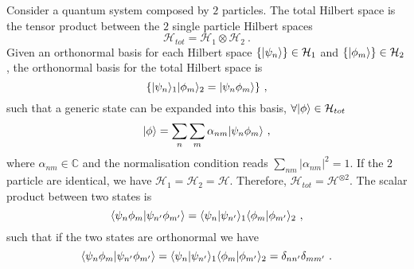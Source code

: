     Consider a quantum system composed by $2$ particles. The total Hilbert space is the tensor product between the $2$ single particle Hilbert spaces 
    \begin{equation*}
        \mathcal H_{tot} = \mathcal H_1 \otimes \mathcal H_2 ~. 
    \end{equation*}
    Given an orthonormal basis for each Hilbert space $\{\vert\psi_n\rangle\} \in \mathcal H_1$ and $\{\vert\phi_m\rangle\} \in \mathcal H_2$, the orthonormal basis for the total Hilbert space is 
    \begin{equation*}
        \{\vert\psi_n\rangle_1 \vert\phi_m\rangle_2 = \vert\psi_n \phi_m\rangle\} ~,
    \end{equation*}
    such that a generic state can be expanded into this basis, $\forall \vert\phi\rangle \in \mathcal H_{tot}$
    \begin{equation*}
        \vert\phi\rangle = \sum_n \sum_m \alpha_{nm} \vert\psi_n \phi_m\rangle ~,
    \end{equation*}
    where $\alpha_{nm} \in \mathbb C$ and the normalisation condition reads $\sum_{nm} |\alpha_{nm}|^2 = 1$. 
    If the $2$ particle are identical, we have $\mathcal H_1 = \mathcal H_2 = \mathcal H$. Therefore, $\mathcal H_{tot} = \mathcal H^{\otimes 2}$.
    The scalar product between two states is 
    \begin{equation*}
        \langle\psi_n \phi_m\vert\psi_{n'} \phi_{m'}\rangle = \langle\psi_n\vert\psi_{n'}\rangle_1 \langle\phi_m\vert\phi_{m'}\rangle_2 ~,
    \end{equation*}
    such that if the two states are orthonormal we have
    \begin{equation*}
        \langle\psi_n \phi_m\vert\psi_{n'} \phi_{m'}\rangle = \langle\psi_n\vert\psi_{n'}\rangle_1 \langle\phi_m\vert\phi_{m'}\rangle_2 = \delta_{nn'} \delta_{mm'} ~. 
    \end{equation*}
    
